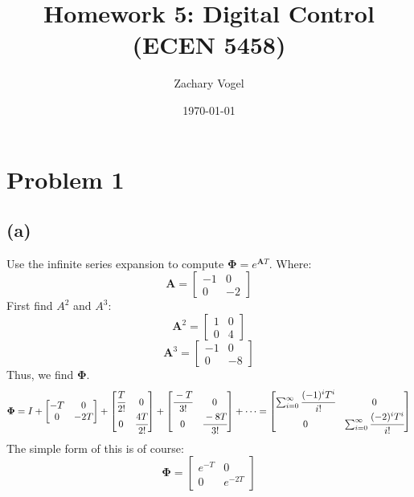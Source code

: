 \documentclass{article}
\title{Homework 5: Digital Control (ECEN 5458)}
\author{Zachary Vogel}
\date{\today}
\begin{document}




\maketitle

\section*{Problem 1}
\subsection*{(a)}
Use the infinite series expansion to compute $\boldsymbol{\Phi}=e^{\boldsymbol{A}T}$. Where:
\[\boldsymbol{A}=\begin{bmatrix}-1 & 0\\0 & -2\end{bmatrix}\]
First find $A^2$ and $A^3$:
\[\boldsymbol{A}^2=\begin{bmatrix}1 & 0\\0 & 4\end{bmatrix}\]
\[\boldsymbol{A}^3=\begin{bmatrix}-1 & 0\\0 & -8\end{bmatrix}\]
Thus, we find $\boldsymbol{\Phi}$.
\[\boldsymbol{\Phi}=I+\begin{bmatrix}-T & 0\\0 & -2T\end{bmatrix}+\begin{bmatrix}\cfrac{T}{2!} & 0\\0 & \cfrac{4T}{2!}\end{bmatrix}+\begin{bmatrix}\cfrac{-T}{3!}&0\\0&\cfrac{-8T}{3!}\end{bmatrix}+\dots=\begin{bmatrix}\sum_{i=0}^{\infty}\cfrac{(-1)^iT^i}{i!}&0\\0&\sum_{i=0}^\infty\cfrac{(-2)^iT^i}{i!}\end{bmatrix}\]
The simple form of this is of course:
\[\boldsymbol{\Phi}=\begin{bmatrix}e^{-T}&0\\0&e^{-2T}\end{bmatrix}\]
\end{document}
